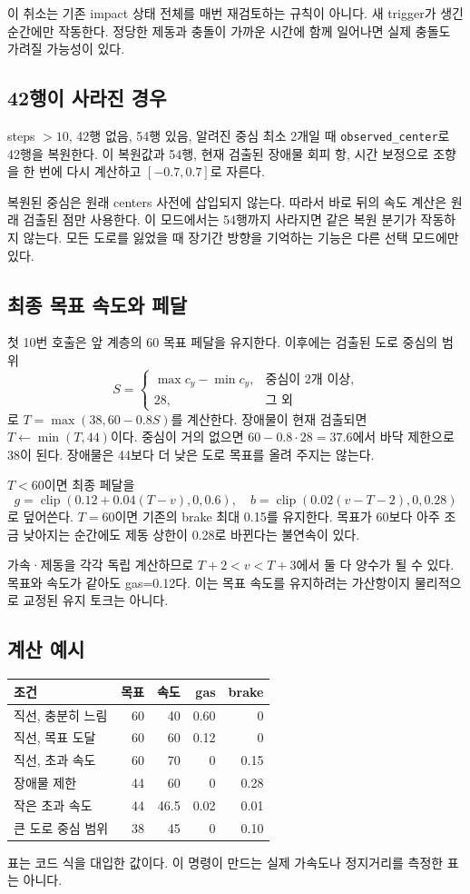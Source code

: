 \documentclass[11pt,a4paper]{article}
\newcommand{\code}[1]{{\small\nolinkurl{#1}}}
\newcommand{\clip}{\operatorname{clip}}
\begin{document}
이 취소는 기존 impact 상태 전체를 매번 재검토하는 규칙이 아니다. 새 trigger가 생긴 순간에만 작동한다. 정당한 제동과 충돌이 가까운 시간에 함께 일어나면 실제 충돌도 가려질 가능성이 있다.

\subsection{42행이 사라진 경우}
steps $>10$, 42행 없음, 54행 있음, 알려진 중심 최소 2개일 때 \code{observed_center}로 42행을 복원한다. 이 복원값과 54행, 현재 검출된 장애물 회피 항, 시간 보정으로 조향을 한 번에 다시 계산하고 $[-0.7,0.7]$로 자른다.

복원된 중심은 원래 centers 사전에 삽입되지 않는다. 따라서 바로 뒤의 속도 계산은 원래 검출된 점만 사용한다. 이 모드에서는 54행까지 사라지면 같은 복원 분기가 작동하지 않는다. 모든 도로를 잃었을 때 장기간 방향을 기억하는 기능은 다른 선택 모드에만 있다.

\subsection{최종 목표 속도와 페달}
첫 10번 호출은 앞 계층의 60 목표 페달을 유지한다. 이후에는 검출된 도로 중심의 범위
\[
 S=\begin{cases}\max c_y-\min c_y,&\text{중심이 2개 이상},\\28,&\text{그 외}\end{cases}
\]
로 $T=\max(38,60-0.8S)$를 계산한다. 장애물이 현재 검출되면 $T\leftarrow\min(T,44)$이다. 중심이 거의 없으면 $60-0.8\cdot28=37.6$에서 바닥 제한으로 38이 된다. 장애물은 44보다 더 낮은 도로 목표를 올려 주지는 않는다.

$T<60$이면 최종 페달을
\[
 g=\clip(0.12+0.04(T-v),0,0.6),\quad
 b=\clip(0.02(v-T-2),0,0.28)
\]
로 덮어쓴다. $T=60$이면 기존의 brake 최대 0.15를 유지한다. 목표가 60보다 아주 조금 낮아지는 순간에도 제동 상한이 0.28로 바뀐다는 불연속이 있다.

가속·제동을 각각 독립 계산하므로 $T+2<v<T+3$에서 둘 다 양수가 될 수 있다. 목표와 속도가 같아도 gas=0.12다. 이는 목표 속도를 유지하려는 가산항이지 물리적으로 교정된 유지 토크는 아니다.

\subsection{계산 예시}
\par\noindent\begin{tabularx}{\linewidth}{@{}Xrrrr@{}}\toprule
조건 & 목표 & 속도 & gas & brake \\\midrule
직선, 충분히 느림 & 60 & 40 & 0.60 & 0 \\
직선, 목표 도달 & 60 & 60 & 0.12 & 0 \\
직선, 초과 속도 & 60 & 70 & 0 & 0.15 \\
장애물 제한 & 44 & 60 & 0 & 0.28 \\
작은 초과 속도 & 44 & 46.5 & 0.02 & 0.01 \\
큰 도로 중심 범위 & 38 & 45 & 0 & 0.10 \\\bottomrule
\end{tabularx}
표는 코드 식을 대입한 값이다. 이 명령이 만드는 실제 가속도나 정지거리를 측정한 표는 아니다.
\end{document}
